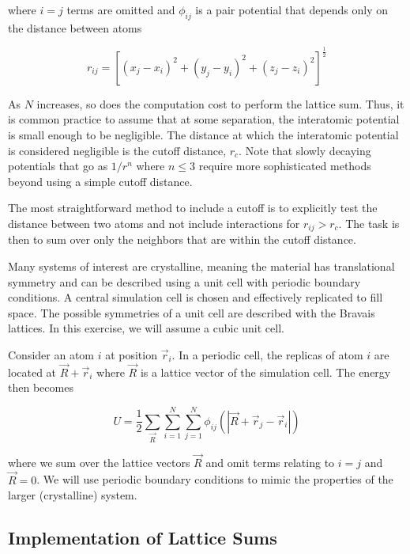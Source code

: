 \documentclass[11pt]{article}
\begin{document}
where \(i=j\) terms are omitted and \(\phi_{ij}\) is a pair potential
that depends only on the distance between atoms

\begin{equation}
r_{ij} = [(x_j - x_i)^2 + (y_j - y_i)^2 +(z_j - z_i)^2]^{\frac{1}{2}}
\end{equation}

As \(N\) increases, so does the computation cost to perform the lattice
sum. Thus, it is common practice to assume that at some separation, the
interatomic potential is small enough to be negligible. The distance at
which the interatomic potential is considered negligible is the cutoff
distance, \(r_c\). Note that slowly decaying potentials that go as
\(1/r^n\) where $n \leq 3 $ require more sophisticated methods beyond
using a simple cutoff distance.

The most straightforward method to include a cutoff is to explicitly
test the distance between two atoms and not include interactions for
\(r_{ij} > r_c\). The task is then to sum over only the neighbors that
are within the cutoff distance.

Many systems of interest are crystalline, meaning the material has
translational symmetry and can be described using a unit cell with
periodic boundary conditions. A central simulation cell is chosen and
effectively replicated to fill space. The possible symmetries of a unit
cell are described with the Bravais lattices. In this exercise, we will
assume a cubic unit cell.

Consider an atom \(i\) at position $\vec{r}_i$. In a periodic cell,
the replicas of atom \(i\) are located at $\vec{R} + \vec{r}_i$ where
$\vec{R}$ is a lattice vector of the simulation cell. The energy then
becomes

\begin{equation}
U = \frac{1}{2}\sum_{\vec{R}} \sum_{i=1}^N \sum_{j=1}^N \phi_{ij} (|\vec{R}+\vec{r}_j-\vec{r}_i|)
\end{equation}

where we sum over the lattice vectors \(\vec{R}\) and omit terms
relating to \(i=j\) and \(\vec{R} = 0\). We will use periodic boundary
conditions to mimic the properties of the larger (crystalline) system.

    \hypertarget{implementation-of-lattice-sums}{%
\subsection{Implementation of Lattice
Sums}\label{implementation-of-lattice-sums}}
\end{document}
